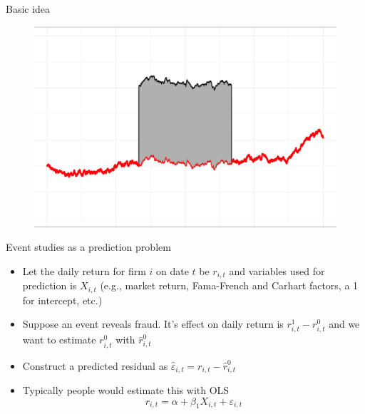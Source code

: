 \documentclass{beamer}
\begin{document}
\begin{frame}{Basic idea}

\begin{figure}
\includegraphics[scale=0.35]{./lecture_includes/baker_gelbach_2}
\end{figure}
\end{frame}


\begin{frame}{Event studies as a prediction problem}

\begin{itemize}
\item Let the daily return for firm $i$ on date $t$ be $r_{i,t}$ and variables used for prediction is $X_{i,t}$ (e.g., market return, Fama-French and Carhart factors, a 1 for intercept, etc.)
\item Suppose an event reveals fraud.  It's effect on daily return is $r^1_{i,t} - r^0_{i,t}$ and we want to estimate $r^0_{i,t}$ with $\widehat{r}^0_{i,t}$
\item Construct a predicted residual as $\widehat{\varepsilon}_{i,t} = r_{i,t} - \widehat{r}^0_{i,t}$
\item Typically people would estimate this with OLS $$r_{i,t} = \alpha + \beta_1 X_{i,t} + \varepsilon_{i,t}$$
\end{itemize}

\end{frame}
\end{document}
